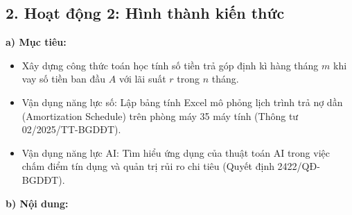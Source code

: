 \documentclass[12pt, a4paper]{article}
\begin{document}
\subsection*{2. Hoạt động 2: Hình thành kiến thức}

\noindent \textbf{a) Mục tiêu:}
\begin{itemize}
    \item Xây dựng công thức toán học tính số tiền trả góp định kì hàng tháng $m$ khi vay số tiền ban đầu $A$ với lãi suất $r$ trong $n$ tháng.
    \item Vận dụng năng lực số: Lập bảng tính Excel mô phỏng lịch trình trả nợ dần (Amortization Schedule) trên phòng máy 35 máy tính (Thông tư 02/2025/TT-BGDĐT).
    \item Vận dụng năng lực AI: Tìm hiểu ứng dụng của thuật toán AI trong việc chấm điểm tín dụng và quản trị rủi ro chi tiêu (Quyết định 2422/QĐ-BGDĐT).
\end{itemize}

\noindent \textbf{b) Nội dung:}
\end{document}
